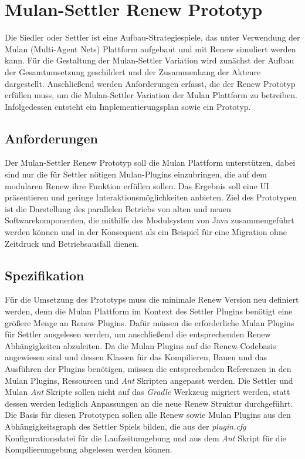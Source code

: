 \chapter{Mulan-Settler Renew Prototyp} \label{cha:mulan_settler}
	Die Siedler oder Settler ist eine Aufbau-Strategiespiele, das unter Verwendung der Mulan (Multi-Agent Nets) Plattform aufgebaut und mit Renew simuliert werden kann. \bigbreak
	Für die Gestaltung der Mulan-Settler Variation wird zunächst der Aufbau der Gesamtumsetzung geschildert und der Zusammenhang der Akteure dargestellt. Anschließend werden Anforderungen erfasst, die der Renew Prototyp erfüllen muss, um die Mulan-Settler Variation der Mulan Plattform zu betreiben. Infolgedessen entsteht ein Implementierungsplan sowie ein Prototyp.

\section{Anforderungen} \label{sec:anforderungen2}
	Der Mulan-Settler Renew Prototyp soll die Mulan Plattform unterstützen, dabei sind nur die für Settler nötigen Mulan-Plugins einzubringen, die auf dem modularen Renew ihre Funktion erfüllen sollen. Das Ergebnis soll eine UI präsentieren und geringe Interaktionsmöglichkeiten anbieten. \newline 
	Ziel des Prototypen ist die Darstellung des parallelen Betriebs von alten und neuen Softwarekomponenten, die mithilfe des Modulsystem von Java zusammengeführt werden können und in der Konsequent als ein Beispiel für eine Migration ohne  Zeitdruck und Betriebsausfall dienen.

\section{Spezifikation}
	Für die Umsetzung des Prototyps muss die minimale Renew Version neu definiert werden, denn die Mulan Plattform im Kontext des Settler Plugins benötigt eine größere Menge an Renew Plugins. Dafür müssen die erforderliche Mulan Plugins für Settler ausgelesen werden, um anschließend die entsprechenden Renew Abhängigkeiten abzuleiten. \newline
	Da die Mulan Plugins auf die Renew-Codebasis angewiesen sind und dessen Klassen für das Kompilieren, Bauen und das Ausführen der Plugins benötigen, müssen die entsprechenden Referenzen in den Mulan Plugins, Ressourcen und \textit{Ant} Skripten angepasst werden. \newline
	Die Settler und Mulan \textit{Ant} Skripte sollen nicht auf das \textit{Gradle} Werkzeug migriert werden, statt dessen werden lediglich Anpassungen an die neue Renew Struktur durchgeführt. \bigbreak
	Die Basis für diesen Prototypen sollen alle Renew sowie Mulan Plugins aus den Abhängigkeitsgraph des Settler Spiels bilden, die aus der \textit{plugin.cfg} Konfigurationsdatei für die Laufzeitumgebung und aus dem \textit{Ant} Skript für die Kompilierumgebung abgelesen werden können. 


